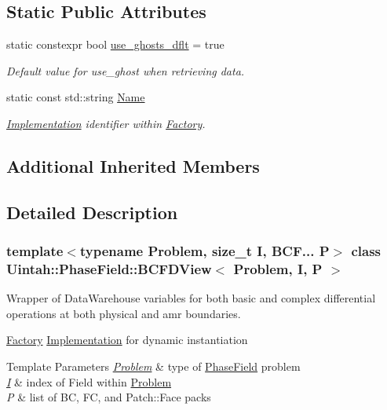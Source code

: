 \subsection*{Static Public Attributes}
\begin{DoxyCompactItemize}
\item 
static constexpr bool \hyperlink{classUintah_1_1PhaseField_1_1BCFDView_a7746f0ab792c1d5201e8917409fab236}{use\+\_\+ghosts\+\_\+dflt} = true
\begin{DoxyCompactList}\small\item\em Default value for use\+\_\+ghost when retrieving data. \end{DoxyCompactList}\item 
static const std\+::string \hyperlink{classUintah_1_1PhaseField_1_1BCFDView_accb8305fbad15fe1920987ce17148773}{Name}
\begin{DoxyCompactList}\small\item\em \hyperlink{classUintah_1_1PhaseField_1_1Implementation}{Implementation} identifier within \hyperlink{classUintah_1_1PhaseField_1_1Factory}{Factory}. \end{DoxyCompactList}\end{DoxyCompactItemize}
\subsection*{Additional Inherited Members}


\subsection{Detailed Description}
\subsubsection*{template$<$typename Problem, size\+\_\+t I, B\+C\+F... P$>$\newline
class Uintah\+::\+Phase\+Field\+::\+B\+C\+F\+D\+View$<$ Problem, I, P $>$}

Wrapper of Data\+Warehouse variables for both basic and complex differential operations at both physical and amr boundaries. 

\hyperlink{classUintah_1_1PhaseField_1_1Factory}{Factory} \hyperlink{classUintah_1_1PhaseField_1_1Implementation}{Implementation} for dynamic instantiation


\begin{DoxyTemplParams}{Template Parameters}
{\em \hyperlink{classUintah_1_1PhaseField_1_1Problem}{Problem}} & type of \hyperlink{namespaceUintah_1_1PhaseField}{Phase\+Field} problem \\
\hline
{\em \hyperlink{structUintah_1_1PhaseField_1_1I}{I}} & index of Field within \hyperlink{classUintah_1_1PhaseField_1_1Problem}{Problem} \\
\hline
{\em P} & list of BC, FC, and Patch\+::\+Face packs \\
\hline
\end{DoxyTemplParams}


